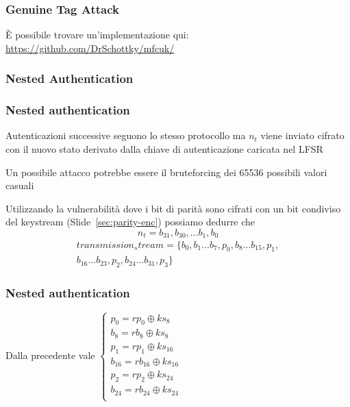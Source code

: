 \begin{frame}
    \frametitle{Genuine Tag Attack}
    È possibile trovare un'implementazione qui: \href{https://github.com/DrSchottky/mfcuk/blob/master/src/mfcuk.c\#L623}{https://github.com/DrSchottky/mfcuk/}
\end{frame}

\subsubsection{Nested Authentication}
\begin{frame}
    \frametitle{Nested authentication}\label{sec:nested-auth}
    Autenticazioni successive seguono lo stesso protocollo ma $n_t$ viene inviato cifrato con il nuovo stato derivato dalla chiave di autenticazione
    caricata nel LFSR\pause

    Un possibile attacco potrebbe essere il bruteforcing dei 65536 possibili valori casuali\pause

    Utilizzando la vulnerabilità dove i bit di parità sono cifrati con un bit condiviso del keystream (Slide~\ref{sec:parity-enc}) possiamo dedurre che
    \[n_t = {b_{31},b_{30}, ... b_1, b_0}\]
    \begin{multline*}
        transmission_stream = \{b_0, b_1 ... b_7, p_0, b_8 ... b_{15}, p_1, \\ b_{16} ... b_{23}, p_2, b_{24} ... b_{31}, p_3\}
    \end{multline*}

\end{frame}

\begin{frame}
    \frametitle{Nested authentication}
    Dalla precedente vale
    \begin{math}
        \begin{cases}
            p_0 = rp_0 \oplus ks_8\\
            b_8 = rb_8 \oplus ks_8\\
            p_1 = rp_1 \oplus ks_{16}\\
            b_{16} = rb_{16} \oplus ks_{16}\\
            p_2 = rp_2 \oplus ks_{24}\\
            b_{24} = rb_{24} \oplus ks_{24}\\
        \end{cases}
    \end{math}
\end{frame}

